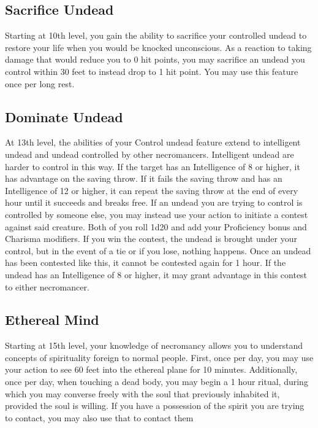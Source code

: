 \documentclass[10pt,twoside,twocolumn,openany]{book}
\begin{document}
\subsection{Sacrifice Undead}
Starting at 10th level, you gain the ability to sacrifice your controlled undead to restore your life when you would be knocked unconscious. As a reaction to taking damage that would reduce you to 0 hit points, you may sacrifice an undead you control within 30 feet to instead drop to 1 hit point. You may use this feature once per long rest.

\subsection{Dominate Undead}
At 13th level, the abilities of your Control undead feature extend to intelligent undead and undead controlled by other necromancers. Intelligent undead are harder to control in this way. If the target has an Intelligence of 8 or higher, it has advantage on the saving throw. If it fails the saving throw and has an Intelligence of 12 or higher, it can repeat the saving throw at the end of every hour until it succeeds and breaks free.
If an undead you are trying to control is controlled by someone else, you may instead use your action to initiate a contest against said creature. Both of you roll 1d20 and add your Proficiency bonus and Charisma modifiers. If you win the contest, the undead is brought under your control, but in the event of a tie or if you lose, nothing happens. Once an undead has been contested like this, it cannot be contested again for 1 hour. If the undead has an Intelligence of 8 or higher, it may grant advantage in this contest to either necromancer.

\subsection{Ethereal Mind}
Starting at 15th level, your knowledge of necromancy allows you to understand concepts of spirituality foreign to normal people. First, once per day, you may use your action to see 60 feet into the ethereal plane for 10 minutes.
Additionally, once per day, when touching a dead body, you may begin a 1 hour ritual, during which you may converse freely with the soul that previously inhabited it, provided the soul is willing. If you have a possession of the spirit you are trying to contact, you may also use that to contact them
\end{document}
